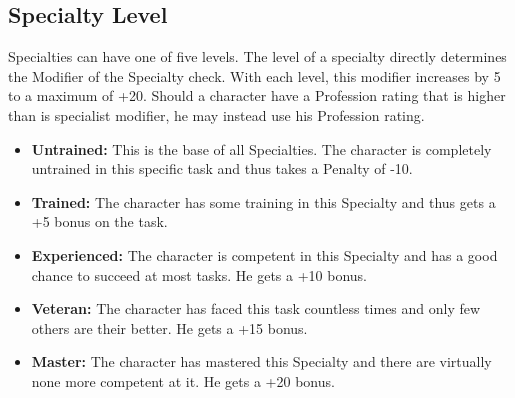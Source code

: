 \subsection{Specialty Level}\label{skill_level}
Specialties can have one of five levels. The level of a specialty directly determines the Modifier of the Specialty check. With each level, this modifier increases by 5 to a maximum of +20. Should a character have a Profession rating that is higher than is specialist modifier, he may instead use his Profession rating.
\begin{itemize}
	\item \textbf{Untrained:} This is the base of all Specialties. The character is completely untrained in this specific task and thus takes a Penalty of -10.
	\item \textbf{Trained:} The character has some training in this Specialty and thus gets a +5 bonus on the task.
	\item \textbf{Experienced:} The character is competent in this Specialty and has a good chance to succeed at most tasks. He gets a +10 bonus.
	\item \textbf{Veteran:} The character has faced this task countless times and only few others are their better. He gets a +15 bonus.
	\item \textbf{Master:} The character has mastered this Specialty and there are virtually none more competent at it. He gets a +20 bonus.
\end{itemize}

